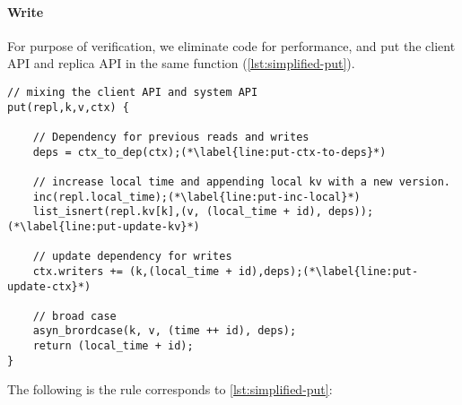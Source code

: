 \paragraph{\bf Write}
For purpose of verification, we eliminate code for performance, and put the client API and replica API in the same function (\cref{lst:simplified-put}).
\begin{lstlisting}[caption={put},label={lst:simplified-put}]
// mixing the client API and system API
put(repl,k,v,ctx) {

    // Dependency for previous reads and writes
    deps = ctx_to_dep(ctx);(*\label{line:put-ctx-to-deps}*)

    // increase local time and appending local kv with a new version.
    inc(repl.local_time);(*\label{line:put-inc-local}*) 
    list_isnert(repl.kv[k],(v, (local_time + id), deps));(*\label{line:put-update-kv}*)

    // update dependency for writes
    ctx.writers += (k,(local_time + id),deps);(*\label{line:put-update-ctx}*)

    // broad case
    asyn_brordcase(k, v, (time ++ id), deps);
    return (local_time + id);
}
\end{lstlisting}

The following is the rule corresponds to \cref{lst:simplified-put}:

\begin{mathpar}
\end{mathpar}

